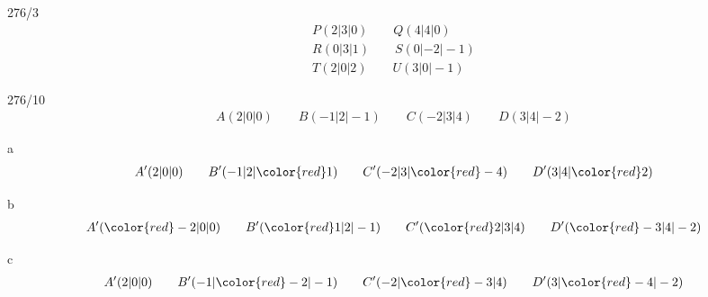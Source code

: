 \begin{exercise}{276/3}
  \begin{gather*}
    P(2|3|0) \qquad Q(4|4|0) \\
    R(0|3|1) \qquad S(0|-2|-1) \\
    T(2|0|2) \qquad U(3|0|-1)
  \end{gather*}
\end{exercise}
\begin{exercise}{276/10}
  \begin{gather*}
    A(2|0|0) \qquad B(-1|2|-1) \qquad C(-2|3|4) \qquad D(3|4|-2)
  \end{gather*}
  \item [a]
  \begin{gather*}
    A'(2|0|0) \qquad B'(-1|2|{\color{red}1}) \qquad C'(-2|3|{\color{red}-4}) \qquad D'(3|4|{\color{red}2})
  \end{gather*}
  \item [b]
  \begin{gather*}
    A'({\color{red}-2}|0|0) \qquad B'({\color{red}1}|2|-1) \qquad C'({\color{red}2}|3|4) \qquad D'({\color{red}-3}|4|-2)
  \end{gather*}
  \item [c]
  \begin{gather*}
    A'(2|0|0) \qquad B'(-1|{\color{red}-2}|-1) \qquad C'(-2|{\color{red}-3}|4) \qquad D'(3|{\color{red}-4}|-2)
  \end{gather*}
\end{exercise}
